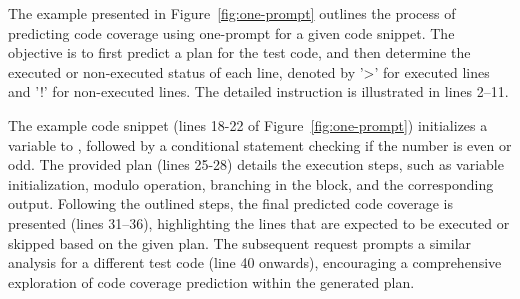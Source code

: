 

The example presented in Figure~\ref{fig:one-prompt} outlines the process of predicting code coverage using one-prompt {\tool} for a given code snippet. The objective is to first predict a plan for the test code, and then determine the executed or non-executed status of each line, denoted by '>' for executed lines and '!' for non-executed lines. The detailed instruction is illustrated in lines 2--11.

The example code snippet (lines 18-22 of Figure~\ref{fig:one-prompt}) initializes a variable  to , followed by a conditional statement checking if the number is even or odd. The provided plan (lines 25-28) details the execution steps, such as variable initialization, modulo operation, branching in the  block, and the corresponding output. Following the outlined steps, the final predicted code coverage is presented (lines 31--36), highlighting the lines that are expected to be executed or skipped based on the given plan.
The subsequent request prompts a similar analysis for a different test code (line 40 onwards), encouraging a comprehensive exploration of code coverage prediction within the generated plan.


